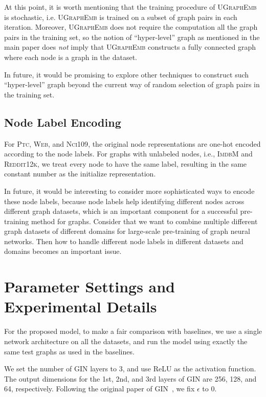 \documentclass{article}
\newcommand{\model}{\textsc{UGraphEmb}\xspace}
\newcommand{\gin}{\textsc{GIN}\xspace}
\newcommand{\ptc}{\textsc{Ptc}\xspace}
\newcommand{\imdb}{\textsc{ImdbM}\xspace}
\newcommand{\web}{\textsc{Web}\xspace}
\newcommand{\nci}{\textsc{Nci109}\xspace}
\newcommand{\reddit}{\textsc{Reddit12k}\xspace}
\begin{document}
At this point, it is worth mentioning that the training procedure of \model is stochastic, i.e. \model is trained on a subset of graph pairs in each iteration. Moreover, \model does not require the computation all the graph pairs in the training set, so the notion of ``hyper-level'' graph as mentioned in the main paper does \textit{not} imply that \model constructs a fully connected graph where each node is a graph in the dataset.

In future, it would be promising to explore other techniques to construct such ``hyper-level'' graph beyond the current way of random selection of graph pairs in the training set.

\subsection{Node Label Encoding}
\label{subsec-nle}



For \ptc, \web, and \nci, the original node representations are one-hot encoded according to the node labels. For graphs with unlabeled nodes, i.e., \imdb and \reddit, we treat every node to have the same label, resulting in the same constant number as the initialize representation. 

In future, it would be interesting to consider more sophisticated ways to encode these node labels, because node labels help identifying different nodes across different graph datasets, which is an important component for a successful pre-training method for graphs. Consider that we want to combine multiple different graph datasets of different domains for large-scale pre-training of graph neural networks. Then how to handle different node labels in different datasets and domains becomes an important issue.






 \section{Parameter Settings and Experimental Details} 
\label{sec-param-set}

For the proposed model, to make a fair comparison with baselines, we use a single network architecture on all the datasets, and run the model using exactly the same test graphs as used in the baselines. 

We set the number of \gin layers to 3, and use ReLU as the activation function. The output dimensions for the 1st, 2nd, and 3rd layers of \gin are 256, 128, and 64, respectively. Following the original paper of \gin~\cite{xu2018powerful}, we fix $\epsilon$ to 0.
\end{document}
